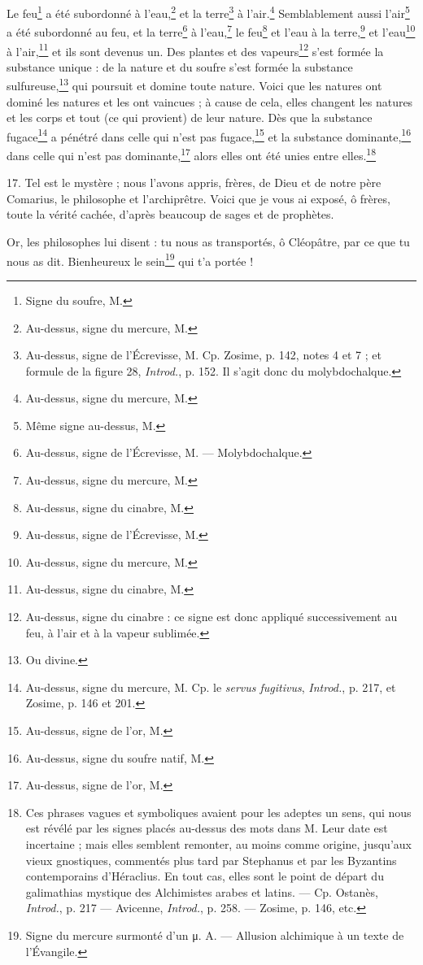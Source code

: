 \documentclass[a4paper, 11pt, oneside, polutonikogreek, french]{article}
\begin{document}
Le feu\footnote{Signe du soufre, M.} a été subordonné à l'eau,\footnote{Au-dessus, signe du mercure, M.} et la terre\footnote{Au-dessus, signe de l'Écrevisse, M. Cp. Zosime, p. 142, notes 4 et 7 ; et formule de la figure 28, \emph{Introd.}, p. 152. Il s'agit donc du molybdochalque.} à l'air.\footnote{Au-dessus, signe du mercure, M.} Semblablement aussi l'air\footnote{Même signe au-dessus, M.} a été subordonné au feu, et la terre\footnote{Au-dessus, signe de l'Écrevisse, M. --- Molybdochalque.} à l'eau,\footnote{Au-dessus, signe du mercure, M.} le feu\footnote{Au-dessus, signe du cinabre, M.} et l'eau à la terre,\footnote{Au-dessus, signe de l'Écrevisse, M.} et l'eau\footnote{Au-dessus, signe du mercure, M.} à l'air,\footnote{Au-dessus, signe du cinabre, M.} et ils sont devenus un. Des plantes et des vapeurs\footnote{Au-dessus, signe du cinabre : ce signe est donc appliqué successivement au feu, à l'air et à la vapeur sublimée.} s'est formée la substance unique : de la nature et du soufre s'est formée la substance sulfureuse,\footnote{Ou divine.} qui poursuit et domine toute nature. Voici que les natures ont dominé les natures et les ont vaincues ; à cause de cela, elles changent les natures et les corps et tout (ce qui provient) de leur nature. Dès que la substance fugace\footnote{Au-dessus, signe du mercure, M. Cp. le \emph{servus fugitivus}, \emph{Introd.}, p. 217, et Zosime, p. 146 et 201.} a pénétré dans celle qui n'est pas fugace,\footnote{Au-dessus, signe de l'or, M.} et la substance dominante,\footnote{Au-dessus, signe du soufre natif, M.} dans celle qui n'est pas dominante,\footnote{Au-dessus, signe de l'or, M.} alors elles ont été unies entre elles.\footnote{Ces phrases vagues et symboliques avaient pour les adeptes un sens, qui nous est révélé par les signes placés au-dessus des mots dans M. Leur date est incertaine ; mais elles semblent remonter, au moins comme origine, jusqu'aux vieux gnostiques, commentés plus tard par Stephanus et par les Byzantins contemporains d'Héraclius. En tout cas, elles sont le point de départ du galimathias mystique des Alchimistes arabes et latins. --- Cp. Ostanès, \emph{Introd.}, p. 217 --- Avicenne, \emph{Introd.}, p. 258. --- Zosime, p. 146, etc.}

17. Tel est le mystère ; nous l'avons appris, frères, de Dieu et de notre père Comarius, le philosophe et l'archiprêtre. Voici que je vous ai exposé, ô frères, toute la vérité cachée, d'après beaucoup de sages et de prophètes.

Or, les philosophes lui disent : tu nous as transportés, ô Cléopâtre, par ce que tu nous as dit. Bienheureux le sein\footnote{Signe du mercure surmonté d'un μ. A. --- Allusion alchimique à un texte de l'Évangile.} qui t'a portée !
\end{document}
